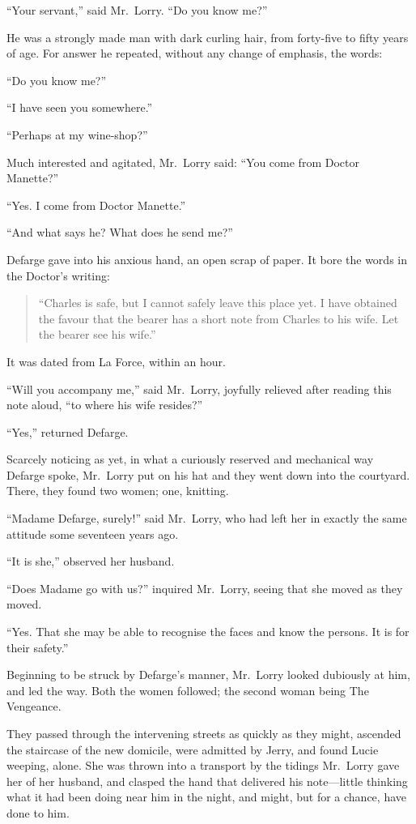 ``Your servant,'' said Mr.\ Lorry.  ``Do you know me?''

He was a strongly made man with dark curling hair, from forty-five to
fifty years of age.  For answer he repeated, without any change of
emphasis, the words:

``Do you know me?''

``I have seen you somewhere.''

``Perhaps at my wine-shop?''

Much interested and agitated, Mr.\ Lorry said:  ``You come from Doctor
Manette?''

``Yes.  I come from Doctor Manette.''

``And what says he?  What does he send me?''

Defarge gave into his anxious hand, an open scrap of paper.  It bore
the words in the Doctor's writing:

\begin{quote}
    ``Charles is safe, but I cannot safely leave this place yet.
     I have obtained the favour that the bearer has a short note
     from Charles to his wife.  Let the bearer see his wife.''
\end{quote}

It was dated from La Force, within an hour.

``Will you accompany me,'' said Mr.\ Lorry, joyfully relieved after
reading this note aloud, ``to where his wife resides?''

``Yes,'' returned Defarge.

Scarcely noticing as yet, in what a curiously reserved and mechanical
way Defarge spoke, Mr.\ Lorry put on his hat and they went down into
the courtyard.  There, they found two women; one, knitting.

``Madame Defarge, surely!'' said Mr.\ Lorry, who had left her in exactly
the same attitude some seventeen years ago.

``It is she,'' observed her husband.

``Does Madame go with us?'' inquired Mr.\ Lorry, seeing that she moved
as they moved.

``Yes.  That she may be able to recognise the faces and know the persons.
It is for their safety.''

Beginning to be struck by Defarge's manner, Mr.\ Lorry looked
dubiously at him, and led the way.  Both the women followed; the
second woman being The Vengeance.

They passed through the intervening streets as quickly as they might,
ascended the staircase of the new domicile, were admitted by Jerry,
and found Lucie weeping, alone.  She was thrown into a transport by
the tidings Mr.\ Lorry gave her of her husband, and clasped the hand
that delivered his note---little thinking what it had been doing near
him in the night, and might, but for a chance, have done to him.

